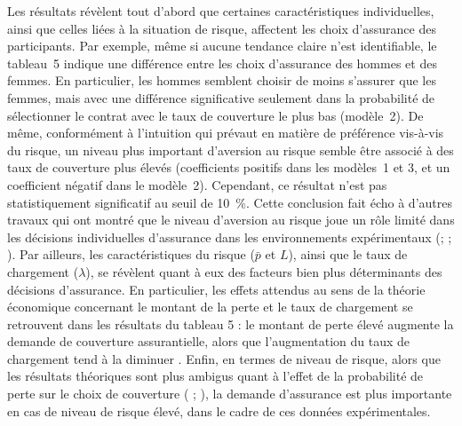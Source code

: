 \begin{Article}
\begin{refsection}[Mouminoux]
  Les résultats révèlent tout d'abord que certaines caractéristiques individuelles, ainsi que celles liées à la situation de risque, affectent les choix d'assurance des participants. Par exemple, même si aucune tendance claire n'est identifiable, le tableau~5 indique une différence entre les choix d'assurance des hommes et des femmes. En particulier, les hommes semblent choisir de moins s'assurer que les femmes, mais avec une différence significative seulement dans la probabilité de sélectionner le contrat avec le taux de couverture le plus bas (modèle~2). De même, conformément à l'intuition qui prévaut en matière de préférence vis-à-vis du risque, un niveau plus important d'aversion au risque semble être associé à des taux de couverture plus élevés (coefficients positifs dans les modèles~1 et 3, et un coefficient négatif dans le modèle~2). Cependant, ce résultat n'est pas statistiquement significatif au seuil de 10~\%. Cette conclusion fait écho à d'autres travaux qui ont montré que le niveau d'aversion au risque joue un rôle limité dans les décisions individuelles d'assurance dans les environnements expérimentaux (\textcite{cpm17}; \textcite{j16}; \textcite{ss11}). Par ailleurs, les caractéristiques du risque ($\bar{p}$ et $L$), ainsi que le taux de chargement ($\lambda$), se révèlent quant à eux des facteurs bien plus déterminants des décisions d'assurance. En particulier, les effets attendus au sens de la théorie économique concernant le montant de la perte et le taux de chargement se retrouvent dans les résultats du tableau 5 : le montant de perte élevé augmente la demande de couverture assurantielle, alors que l'augmentation du taux de chargement tend à la diminuer \parencite{m68}. Enfin, en termes de niveau de risque, alors que les résultats théoriques sont plus ambigus quant à l'effet de la probabilité de perte sur le choix de couverture (\textcite{hr81} ; \textcite{jh95}), la demande d'assurance est plus importante en cas de niveau de risque élevé, dans le cadre de ces données expérimentales.


\end{refsection}
\end{Article}
